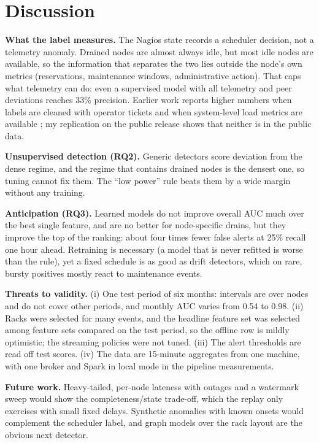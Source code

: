 \section{Discussion}
\label{sec:discussion}
\textbf{What the label measures.} The Nagios state records a scheduler decision, not a telemetry anomaly. Drained nodes are almost always idle, but most idle nodes are available, so the information that separates the two lies outside the node's own metrics (reservations, maintenance windows, administrative action). That caps what telemetry can do: even a supervised model with all telemetry and peer deviations reaches 33\% precision. Earlier work reports higher numbers when labels are cleaned with operator tickets and when system-level load metrics are available \cite{molan2023ruad}; my replication on the public release shows that neither is in the public data.

\textbf{Unsupervised detection (RQ2).} Generic detectors score deviation from the dense regime, and the regime that contains drained nodes is the densest one, so tuning cannot fix them. The ``low power'' rule beats them by a wide margin without any training.

\textbf{Anticipation (RQ3).} Learned models do not improve overall AUC much over the best single feature, and are no better for node-specific drains, but they improve the top of the ranking: about four times fewer false alerts at 25\% recall one hour ahead. Retraining is necessary (a model that is never refitted is worse than the rule), yet a fixed schedule is as good as drift detectors, which on rare, bursty positives mostly react to maintenance events.

\textbf{Threats to validity.} (i) One test period of six months: intervals are over nodes and do not cover other periods, and monthly AUC varies from 0.54 to 0.98. (ii) Racks were selected for many events, and the headline feature set was selected among feature sets compared on the test period, so the offline row is mildly optimistic; the streaming policies were not tuned. (iii) The alert thresholds are read off test scores. (iv) The data are 15-minute aggregates from one machine, with one broker and Spark in local mode in the pipeline measurements.

\textbf{Future work.} Heavy-tailed, per-node lateness with outages and a watermark sweep would show the completeness/state trade-off, which the replay only exercises with small fixed delays. Synthetic anomalies with known onsets would complement the scheduler label, and graph models over the rack layout \cite{molan2024graafe} are the obvious next detector.
